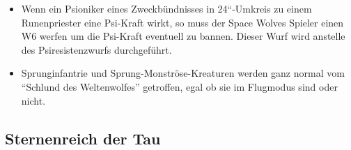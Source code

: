 \begin{itemize}

 \item Wenn ein Psioniker eines Zweckbündnisses in 24“-Umkreis zu einem
  Runenpriester eine Psi-Kraft wirkt, so muss der Space Wolves Spieler einen W6
  werfen um die Psi-Kraft eventuell zu bannen. Dieser Wurf wird anstelle des
  Psiresistenzwurfs durchgeführt.

 \item Sprunginfantrie und Sprung-Monströse-Kreaturen werden ganz normal vom
  ``Schlund des Weltenwolfes'' getroffen, egal ob sie im Flugmodus sind oder
  nicht.

\end{itemize}

\subsection{Sternenreich der Tau}

